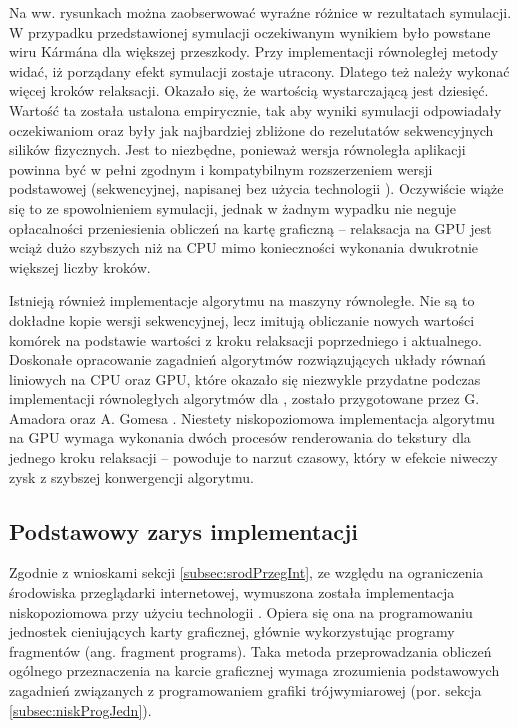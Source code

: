 Na ww. rysunkach można zaobserwować wyraźne różnice w rezultatach symulacji. W
przypadku przedstawionej symulacji oczekiwanym wynikiem było powstane wiru
Kármána dla większej przeszkody. Przy implementacji równoległej metody
 widać, iż porządany efekt symulacji zostaje utracony. Dlatego
też należy wykonać więcej kroków relaksacji. Okazało się, że wartością
wystarczającą jest dziesięć. Wartość ta została ustalona empirycznie, tak aby
wyniki symulacji odpowiadały oczekiwaniom oraz były jak najbardziej zbliżone
do rezelutatów sekwencyjnych silików fizycznych. Jest to niezbędne, ponieważ
wersja równoległa aplikacji \en powinna być w pełni zgodnym i kompatybilnym
rozszerzeniem wersji podstawowej (sekwencyjnej, napisanej bez użycia
technologii ). Oczywiście wiąże się to ze spowolnieniem symulacji,
jednak w żadnym wypadku nie neguje opłacalności przeniesienia obliczeń na
kartę graficzną -- relaksacja na GPU jest wciąż dużo szybszych niż na CPU mimo
konieczności wykonania dwukrotnie większej liczby kroków.

Istnieją również implementacje algorytmu  na maszyny
równoległe. Nie są to dokładne kopie wersji sekwencyjnej, lecz imitują
obliczanie nowych wartości komórek na podstawie wartości z kroku relaksacji
poprzedniego i aktualnego. Doskonałe opracowanie zagadnień algorytmów
rozwiązujących układy równań liniowych na CPU oraz GPU, które okazało się
niezwykle przydatne podczas implementacji równoległych algorytmów dla \en,
zostało przygotowane przez G. Amadora oraz A. Gomesa \cite{LinSolvers}.
Niestety niskopoziomowa implementacja algorytmu  na GPU
wymaga wykonania dwóch procesów renderowania do tekstury dla jednego kroku
relaksacji -- powoduje to narzut czasowy, który w efekcie niweczy zysk z
szybszej konwergencji algorytmu.

\subsection{Podstawowy zarys implementacji}

Zgodnie z wnioskami sekcji \ref{subsec:srodPrzegInt}, ze względu na ograniczenia
środowiska przeglądarki internetowej, wymuszona została implementacja
niskopoziomowa przy użyciu technologii . Opiera się ona na
programowaniu jednostek cieniujących karty graficznej, głównie wykorzystując
programy fragmentów (ang. fragment programs). Taka metoda przeprowadzania
obliczeń ogólnego przeznaczenia na karcie graficznej wymaga zrozumienia
podstawowych zagadnień związanych z programowaniem grafiki trójwymiarowej (por.
sekcja \ref{subsec:niskProgJedn}).

